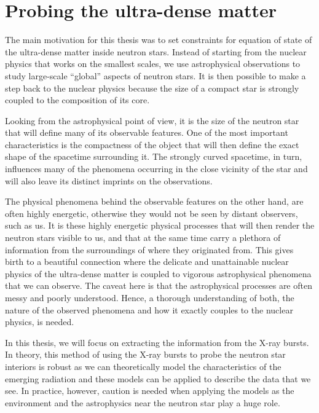 \chapter{Probing the ultra-dense matter}

The main motivation for this thesis was to set constraints for equation of state of the ultra-dense matter inside neutron stars.
Instead of starting from the nuclear physics that works on the smallest scales, we use astrophysical observations to study large-scale ``global'' aspects of neutron stars.
It is then possible to make a step back to the nuclear physics because the size of a compact star is strongly coupled to the composition of its core.

Looking from the astrophysical point of view, it is the size of the neutron star that will define many of its observable features.
One of the most important characteristics is the compactness of the object that will then define the exact shape of the spacetime surrounding it.
The strongly curved spacetime, in turn, influences many of the phenomena occurring in the close vicinity of the star and will also leave its distinct imprints on the observations.

The physical phenomena behind the observable features on the other hand, are often highly energetic, otherwise they would not be seen by distant observers, such as us.
It is these highly energetic physical processes that will then render the neutron stars visible to us, and that at the same time carry a plethora of information from the surroundings of where they originated from.
This gives birth to a beautiful connection where the delicate and unattainable nuclear physics of the ultra-dense matter is coupled to vigorous astrophysical phenomena that we can observe.
The caveat here is that the astrophysical processes are often messy and poorly understood.
Hence, a thorough understanding of both, the nature of the observed phenomena and how it exactly couples to the nuclear physics, is needed.

In this thesis, we will focus on extracting the information from the X-ray bursts.
In theory, this method of using the X-ray bursts to probe the neutron star interiors is robust as we can theoretically model the characteristics of the emerging radiation and these models can be applied to describe the data that we see. 
In practice, however, caution is needed when applying the models as the environment and the astrophysics near the neutron star play a huge role.


